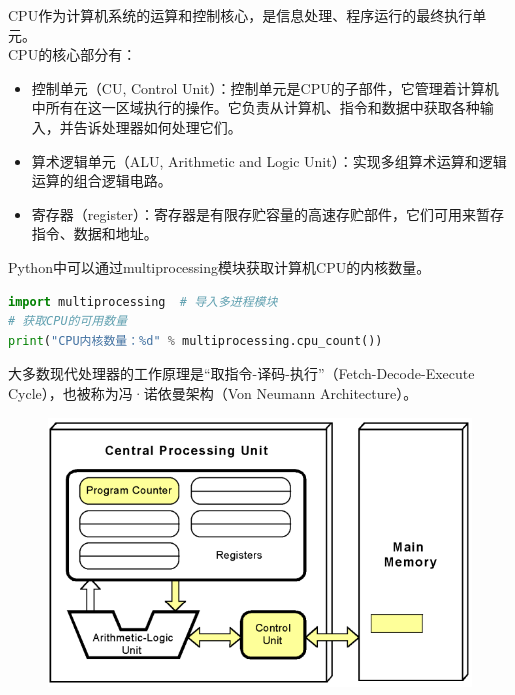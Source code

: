 CPU作为计算机系统的运算和控制核心，是信息处理、程序运行的最终执行单元。\\

CPU的核心部分有：

\begin{itemize}
	\item 控制单元（CU, Control Unit）：控制单元是CPU的子部件，它管理着计算机中所有在这一区域执行的操作。它负责从计算机、指令和数据中获取各种输入，并告诉处理器如何处理它们。

	\item 算术逻辑单元（ALU, Arithmetic and Logic Unit）：实现多组算术运算和逻辑运算的组合逻辑电路。

	\item 寄存器（register）：寄存器是有限存贮容量的高速存贮部件，它们可用来暂存指令、数据和地址。
\end{itemize}

Python中可以通过multiprocessing模块获取计算机CPU的内核数量。\\


\begin{lstlisting}[language=Python]
import multiprocessing	# 导入多进程模块
# 获取CPU的可用数量
print("CPU内核数量：%d" % multiprocessing.cpu_count())
\end{lstlisting}

大多数现代处理器的工作原理是“取指令-译码-执行”（Fetch-Decode-Execute Cycle），也被称为冯·诺依曼架构（Von Neumann Architecture）。

\begin{figure}[H]
	\centering
	\includegraphics[scale=0.5]{img/C1/1-3/1.png}
\end{figure}

